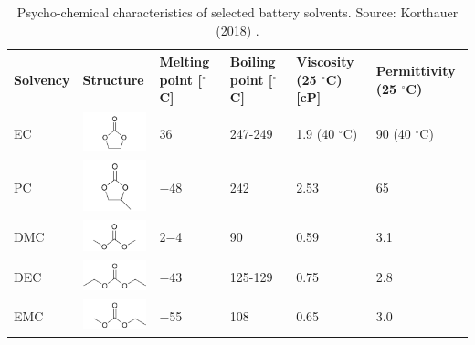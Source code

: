 \begin{table}[H]
    \centering
    \begin{footnotesize}
        \begin{tabular}{|p{16mm} p{24mm} p{20mm} p{20mm} p{20mm} p{24mm}|}
            \hline
            \rowcolor{bluepoli!40}
            \textbf{Solvency} & \textbf{Structure} & \textbf{Melting point} [$^\circ$C] & \textbf{Boiling point} [$^\circ$C] & \textbf{Viscosity} (25 $^\circ$C) [cP] & \textbf{Permittivity} (25 $^\circ$C) \T\B \\
            \hline \hline

            EC & \includegraphics*[width=24mm]{Images/Chapter1/EC.png} & 36 & 247-249 & 1.9 (40 $^\circ$C) & 90 (40 $^\circ$C)\T\B\\
            \hline

            PC & \includegraphics*[width=24mm]{Images/Chapter1/PC.png} & $-$48 & 242 & 2.53 & 65\T\B\\
            \hline

            DMC & \includegraphics*[width=24mm]{Images/Chapter1/DMC.png} & 2$-$4 & 90 & 0.59 & 3.1\T\B\\
            \hline

            DEC & \includegraphics*[width=24mm]{Images/Chapter1/DEC.png} & $-$43 & 125-129 & 0.75 & 2.8\T\B\\
            \hline

            EMC & \includegraphics*[width=24mm]{Images/Chapter1/EMC.png} & $-$55 & 108 & 0.65 & 3.0\T\B\\
            \hline
        \end{tabular}
        \\[10pt]
        \caption[Psycho-chemical characteristics of selected battery solvents]{Psycho-chemical characteristics of selected battery solvents. Source: Korthauer (2018) \cite{korthauer2018lithium}.}
        \label{table:solvents}
    \end{footnotesize}
\end{table}

